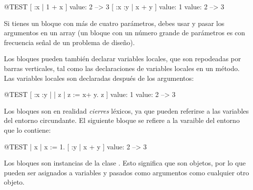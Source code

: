 \documentclass[a4paper,10pt,twoside]{book}
\begin{document}
\begin{code}{@TEST}
[ :x | 1 + x ] value: 2 --> 3
[ :x :y | x + y ] value: 1 value: 2 --> 3
\end{code}

Si tienes un bloque con más de cuatro parámetros, debes usar  y pasar los argumentos en un array (un bloque con un número grande de parámetros es con frecuencia señal de un problema de diseño).

Los bloques pueden también declarar variables locales, que son repodeadas por barras verticales, tal como las declaraciones de variables locales en un método.
Las variables locales son declaradas después de los argumentos:

\begin{code}{@TEST}
[ :x :y | | z | z := x+ y. z ] value: 1 value: 2 --> 3
\end{code}

Los bloques son en realidad \emph{cierres} léxicos, ya que pueden referirse a las variables del entorno circundante. El siguiente bloque se refiere a la varaible  del entorno que lo contiene:

\begin{code}{@TEST}
| x |
x := 1.
[ :y | x + y ] value: 2 --> 3
\end{code}

Los bloques son instancias de la clase .
Esto significa que son objetos, por lo que pueden ser asignados a variables y pasados como argumentos como cualquier otro objeto.


\end{document}
